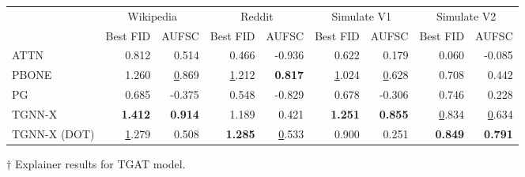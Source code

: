 \begin{tabular}{lrrrrrrrr}
\toprule
 & \multicolumn{2}{c}{Wikipedia} & \multicolumn{2}{c}{Reddit} & \multicolumn{2}{c}{Simulate V1} & \multicolumn{2}{c}{Simulate V2} \\
 & Best FID & AUFSC & Best FID & AUFSC & Best FID & AUFSC & Best FID & AUFSC \\
\midrule
ATTN & 0.812 & 0.514 & 0.466 & -0.936 & 0.622 & 0.179 & 0.060 & -0.085 \\
PBONE & 1.260 & \underline 0.869 & \underline 1.212 & \bfseries 0.817 & \underline 1.024 & \underline 0.628 & 0.708 & 0.442 \\
PG & 0.685 & -0.375 & 0.548 & -0.829 & 0.678 & -0.306 & 0.746 & 0.228 \\
TGNN-X & \bfseries 1.412 & \bfseries 0.914 & 1.189 & 0.421 & \bfseries 1.251 & \bfseries 0.855 & \underline 0.834 & \underline 0.634 \\
TGNN-X (DOT) & \underline 1.279 & 0.508 & \bfseries 1.285 & \underline 0.533 & 0.900 & 0.251 & \bfseries 0.849 & \bfseries 0.791 \\
\bottomrule
\end{tabular}
\caption{\label{tab:tgat_results}$\dagger$ Explainer results for TGAT model.}
